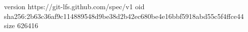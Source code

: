 version https://git-lfs.github.com/spec/v1
oid sha256:2b63c36af9c114889548d9be38d2b42ec680be4e16bbf5918abd55c5f4ffce44
size 626416
